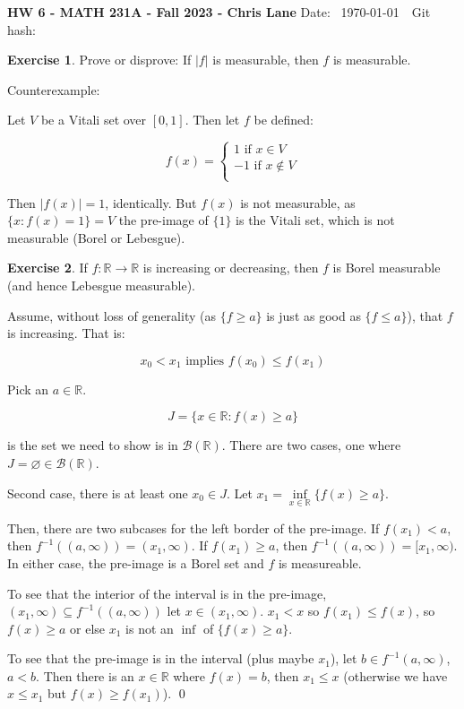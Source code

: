 \documentclass[11pt,oneside]{article}
\numberwithin{equation}{section}
\theoremstyle{definition}
\newtheorem{exercise}{Exercise}
\def\RR{\mathbb{R}}
\def\fancyB{\mathscr{B}}
\begin{document}
\textbf{HW 6 - MATH 231A - Fall 2023 - Chris Lane}
Date: \hhmmsstime{} \ \today \ \ Git hash: 
$  $

\begin{exercise}
  Prove or disprove: If $ |f| $ is measurable, then $f$ is measurable.
\end{exercise}
\begin{solution}
  Counterexample:

  Let $V$ be a Vitali set over $[0,1]$.  Then let $f$ be defined:

  $$
  f(x) = \begin{cases}
    1 \textrm{ if } x \in V \\
    -1 \textrm{ if } x \notin V \\
  \end{cases}
  $$

  Then $|f(x)| = 1$, identically.  But $f(x)$ is not measurable, as $
  \{ x : f(x) = 1 \} = V$ the pre-image of $\{1\}$ is the Vitali set,
  which is not measurable (Borel or Lebesgue).
\end{solution}

\begin{exercise}
  If $ f: \RR \to \RR$ is increasing or decreasing, then $f$ is Borel
  measurable (and hence Lebesgue measurable).
\end{exercise}
\begin{solution}

  Assume, without loss of generality (as $ \{ f \geq a \} $ is just as good as $ \{ f \leq a \}$),
  that $f$ is increasing.  That is:

  $$
  x_0 < x_1 \text { implies } f(x_0) \leq f(x_1)
  $$

  Pick an $a \in \RR$.

  $$
  J = \{ x \in \RR : f(x) \geq a \}
  $$

  is the set we need to show is in $\fancyB(\RR)$.  There are two cases, one
  where $ J = \varnothing \in \fancyB(\RR)$.

  Second case, there is at least one $x_0 \in J$.
  Let $x_1 = \inf \limits _ { x \in \RR } \{ f(x) \geq a \}$.
  
  Then, there are two subcases for the left border of the pre-image.
  If $f(x_1) < a$, then $f^{-1} ((a, \infty)) = (x_1, \infty)$.
  If $f(x_1) \geq a$,
  then $f^{-1} ((a, \infty)) = [x_1, \infty)$.  In either case, the pre-image is a Borel
  set and $f$ is measureable.

  To see that the interior of the interval is in the pre-image,
  $(x_1, \infty) \subseteq f^{-1}((a, \infty))$ let $x \in (x_1, \infty)$.  $x_1 < x$
  so $f(x_1) \leq f(x)$, so $f(x) \geq a$
  or else $x_1$ is not an $\inf $ of $ \{ f(x) \geq a \}$.  
  
  To see that the pre-image is in the interval (plus maybe $x_1$),
  let $b \in f^{-1}(a, \infty)$, $a<b$. Then there is an $x \in \RR$ where $f(x) = b$,
  then $x_1 \leq x$ (otherwise we have $x \leq x_1$  but $f(x) \geq f(x_1)$).  \qed
  
\end{solution}
\end{document}
